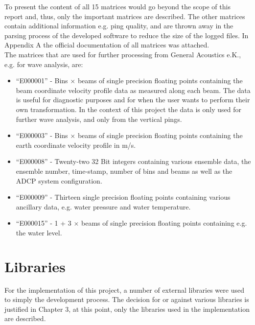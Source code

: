 To present the content of all 15 matrices would go beyond the scope of this report and, thus, only the important matrices are described. The other matrices contain additional information e.g. ping quality, and are thrown away in the parsing process of the developed software to reduce the size of the logged files. In Appendix A the official documentation of all matrices was attached.\\
The matrices that are used for further processing from General Acoustics e.K., e.g. for wave analysis, are:
\begin{itemize}
\item ``E000001'' - Bins $\times$ beams of single precision floating points containing the beam coordinate velocity profile data as measured along each beam. The data is useful for diagnostic purposes and for when the user wants to perform their own transformation. In the context of this project the data is only used for further wave analysis, and only from the vertical pings.
\item``E000003'' - Bins $\times$ beams of single precision floating points containing the earth coordinate velocity profile in m/s. 
\item ``E000008'' - Twenty-two 32 Bit integers containing various ensemble data, the ensemble number, time-stamp, number of bins and beams as well as the ADCP system configuration.
\item ``E000009'' - Thirteen single precision floating points containing various ancillary data, e.g. water pressure and water temperature.
\item ``E000015'' - 1 + 3 $\times$ beams of single precision floating points containing e.g. the water level. 
\end{itemize}

\section{Libraries}
For the implementation of this project, a number of external libraries were used to simply the development process. The decision for or against various libraries is justified in Chapter 3, at this point, only the libraries used in the implementation are described.
